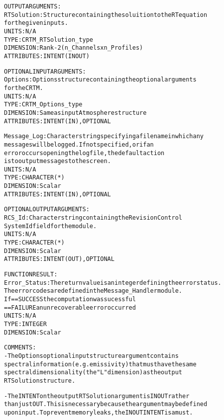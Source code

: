 \begin{alltt}
  OUTPUT ARGUMENTS:
        RTSolution:     Structure containing the soluition to the RT equation
                        for the given inputs.
                        UNITS:      N/A
                        TYPE:       CRTM_RTSolution_type
                        DIMENSION:  Rank-2 (n_Channels x n_Profiles)
                        ATTRIBUTES: INTENT(IN OUT)
 
  OPTIONAL INPUT ARGUMENTS:
        Options:        Options structure containing the optional arguments
                        for the CRTM.
                        UNITS:      N/A
                        TYPE:       CRTM_Options_type
                        DIMENSION:  Same as input Atmosphere structure
                        ATTRIBUTES: INTENT(IN), OPTIONAL
 
        Message_Log:    Character string specifying a filename in which any
                        messages will be logged. If not specified, or if an
                        error occurs opening the log file, the default action
                        is to output messages to the screen.
                        UNITS:      N/A
                        TYPE:       CHARACTER(*)
                        DIMENSION:  Scalar
                        ATTRIBUTES: INTENT(IN), OPTIONAL
 
  OPTIONAL OUTPUT ARGUMENTS:
        RCS_Id:         Character string containing the Revision Control
                        System Id field for the module.
                        UNITS:      N/A
                        TYPE:       CHARACTER(*)
                        DIMENSION:  Scalar
                        ATTRIBUTES: INTENT(OUT), OPTIONAL
 
  FUNCTION RESULT:
        Error_Status:   The return value is an integer defining the error status.
                        The error codes are defined in the Message_Handler module.
                        If == SUCCESS the computation was sucessful
                           == FAILURE an unrecoverable error occurred
                        UNITS:      N/A
                        TYPE:       INTEGER
                        DIMENSION:  Scalar
 
  COMMENTS:
        - The Options optional input structure argument contains
          spectral information (e.g. emissivity) that must have the same
          spectral dimensionality (the "L" dimension) as the output
          RTSolution structure.
 
        - The INTENT on the output RTSolution argument is IN OUT rather
          than just OUT. This is necessary because the argument may be defined
          upon input. To prevent memory leaks, the IN OUT INTENT is a must.
 
  \end{alltt}

